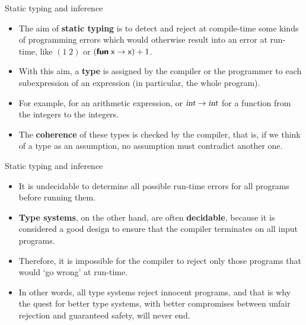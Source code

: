%
\begin{frame}{Static typing and inference}

  \begin{itemize}

    \item The aim of \textbf{static typing} is to detect and reject at
      compile\hyp{}time some kinds of programming errors which would
      otherwise result into an error at run\hyp{}time, like $(1\;2)$
      or $(\textsf{\textbf{fun}} \; \textsf{x} \rightarrow \textsf{x}) + 1$.

    \item With this aim, a \textbf{type} is assigned by the compiler
      or the programmer to each subexpression of an expression (in
      particular, the whole program).

    \item For example,  for an arithmetic expression, or
      $\textsl{int} \rightarrow \textsl{int}$ for a function from the
      integers to the integers.

    \item The \textbf{coherence} of these types is checked by the
      \OCaml compiler, that is, if we think of a type as an
      assumption, no assumption must contradict another one.

  \end{itemize}

\end{frame}

%
\begin{frame}{Static typing and inference}

  \begin{itemize}

    \item It is undecidable to determine all possible run\hyp{}time
      errors for all programs before running them.

    \item \textbf{Type systems}, on the other hand, are often
      \textbf{decidable}, because it is considered a good design to
      ensure that the compiler terminates on all input programs.

    \item Therefore, it is impossible for the compiler to reject only
      those programs that would `go wrong' at run\hyp{}time.

    \item In other words, all type systems reject innocent programs,
      and that is why the quest for better type systems, with better
      compromises between unfair rejection and guaranteed safety, will
      never end.

  \end{itemize}

\end{frame}

